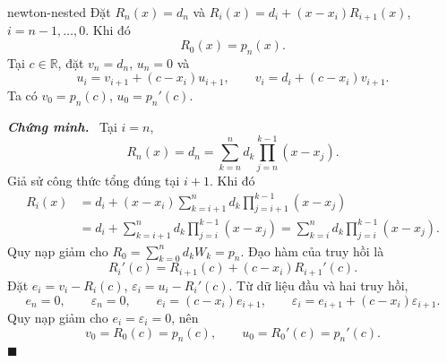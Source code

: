\documentclass[12pt,a4paper,oneside]{book}
\numberwithin{algorithm}{chapter}
\theoremstyle{definition}
\newenvironment{chungminh}{\par\medskip\noindent\textbf{\textit{\color{mainblue}Chứng minh.}}\ }{\hfill$\blacksquare$\par\medskip}
\newcommand{\R}{\mathbb{R}}
\begin{document}
\begin{menhde}{}{newton-nested}
Đặt $R_n(x)=d_n$ và $R_i(x)=d_i+(x-x_i)R_{i+1}(x)$, $i=n-1,\ldots,0$. Khi đó
\begin{equation}\label{eq:newton-nested}
 R_0(x)=p_n(x).
\end{equation}
Tại $c\in\R$, đặt $v_n=d_n$, $u_n=0$ và
\begin{equation}\label{eq:newton-derivative}
 u_i=v_{i+1}+(c-x_i)u_{i+1},\qquad
 v_i=d_i+(c-x_i)v_{i+1}.
\end{equation}
Ta có $v_0=p_n(c)$, $u_0=p_n'(c)$.
\end{menhde}
\begin{chungminh}
Tại $i=n$,
\[
 R_n(x)=d_n=\sum_{k=n}^{n}d_k\prod_{j=n}^{k-1}(x-x_j).
\]
Giả sử công thức tổng đúng tại $i+1$. Khi đó
\begin{align*}
 R_i(x)
 &=d_i+(x-x_i)\sum_{k=i+1}^{n}d_k\prod_{j=i+1}^{k-1}(x-x_j)\\
 &=d_i+\sum_{k=i+1}^{n}d_k\prod_{j=i}^{k-1}(x-x_j)
 =\sum_{k=i}^{n}d_k\prod_{j=i}^{k-1}(x-x_j).
\end{align*}
Quy nạp giảm cho $R_0=\sum_{k=0}^nd_kW_k=p_n$. Đạo hàm của truy hồi là
\[
 R_i'(c)=R_{i+1}(c)+(c-x_i)R_{i+1}'(c).
\]
Đặt $e_i=v_i-R_i(c)$, $\varepsilon_i=u_i-R_i'(c)$. Từ dữ liệu đầu và hai truy hồi,
\[
 e_n=0,\qquad\varepsilon_n=0,\qquad
 e_i=(c-x_i)e_{i+1},\qquad
 \varepsilon_i=e_{i+1}+(c-x_i)\varepsilon_{i+1}.
\]
Quy nạp giảm cho $e_i=\varepsilon_i=0$, nên
\[
 v_0=R_0(c)=p_n(c),\qquad u_0=R_0'(c)=p_n'(c).
\]
\end{chungminh}
\end{document}

